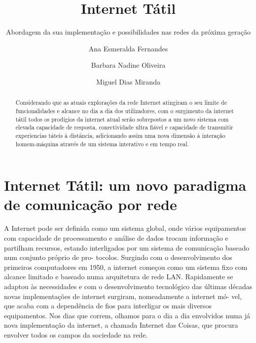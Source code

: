 \documentclass{llncs}
\begin{document}
\mainmatter
\title{Internet Tátil}
\subtitle{Abordagem da sua implementação e possibilidades nas redes da próxima geração}

\author{Ana Esmeralda Fernandes \and Barbara Nadine Oliveira \and Miguel Dias Miranda}



\date{}


\maketitle
\begin{abstract}

Considerando que as atuais explorações da rede Internet atingiram o seu limite de funcionalidades e alcance no dia a dia dos utilizadores, com o surgimento da internet tátil todos os prodígios da internet atual serão sobrepostos a um novo sistema com elevada capacidade de resposta, conectividade ultra fiável e capacidade de transmitir experiencias táteis à distância, adicionando assim uma nova dimensão à interação homem-máquina através de um sistema interativo e em tempo real.

\end{abstract}

\section{Internet Tátil: um novo paradigma de comunicação por rede}
\setlength{\parindent}{0.5cm}
A Internet pode ser definida como um sistema global, onde vários equipamentos com
capacidade de processamento e análise de dados trocam informação e partilham recursos,
estando interligados por um sistema de comunicação baseado num conjunto próprio de pro-
tocolos. Surgindo com o desenvolvimento dos primeiros computadores em 1950, a internet
começou como um sistema fixo com alcance limitado e baseado numa arquitetura de rede
LAN. Rapidamente se adaptou às necessidades e com o desenvolvimento tecnológico das
últimas décadas novas implementações de internet surgiram, nomeadamente a internet mó-
vel, que acaba com a dependência de fios para interligar os mais diversos equipamentos.
Nos dias que correm, olhamos para o dia a dia envolvidos numa já nova implementação da
internet, a chamada Internet das Coisas, que procura envolver todos os campos da sociedade
na rede.
\end{document}
